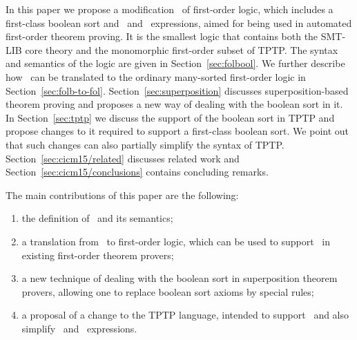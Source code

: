 
In this paper we propose a modification \folb\ of first-order logic, which includes a first-class boolean sort and \ITE\ and \LETIN\ expressions, aimed for being used in automated first-order theorem proving. It is the smallest logic that contains both the SMT-LIB core theory and the monomorphic first-order subset of TPTP. The syntax and semantics of the logic are given in Section~\ref{sec:folbool}.
We further describe how \folb\ can be translated to the ordinary many-sorted first-order logic in Section~\ref{sec:folb-to-fol}.
Section~\ref{sec:superposition} discusses superposition-based theorem proving and proposes a new way of dealing with the boolean sort in it.
In Section~\ref{sec:tptp} we discuss the support of the boolean sort in TPTP and propose changes to it required to support a first-class boolean sort. We point out that such changes can also partially simplify the syntax of TPTP.
Section~\ref{sec:cicm15/related} discusses related work and Section~\ref{sec:cicm15/conclusions} contains concluding remarks.

The main contributions of this paper are the following:

\begin{enumerate}
\item the definition of \folb\ and its semantics;
\item a translation from \folb\ to first-order logic, which can be used to support \folb\ in existing first-order theorem provers;
\item a new technique of dealing with the boolean sort in superposition theorem provers, allowing one to replace boolean sort axioms by special rules;
\item a proposal of a change to the TPTP language, intended to support \folb\ and also simplify \ITE\ and \LETIN\ expressions.
\end{enumerate}
